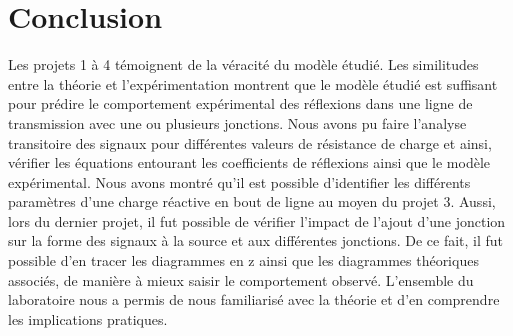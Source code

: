 \section{Conclusion}

Les projets 1 à 4 témoignent de la véracité du modèle étudié. Les similitudes entre la théorie et l'expérimentation montrent que le modèle étudié est suffisant pour prédire le comportement expérimental des réflexions dans une ligne de transmission avec une ou plusieurs jonctions. Nous avons pu faire l'analyse transitoire des signaux pour différentes valeurs de résistance de charge et ainsi, vérifier les équations entourant les coefficients de réflexions ainsi que le modèle expérimental.  Nous avons montré qu'il est possible d'identifier les différents paramètres d'une charge réactive en bout de ligne au moyen du projet 3. Aussi, lors du dernier projet, il fut possible de vérifier l'impact de l'ajout d'une jonction sur la forme des signaux à la source et aux différentes jonctions. De ce fait, il fut possible d'en tracer les diagrammes en z ainsi que les diagrammes théoriques associés, de manière à mieux saisir le comportement observé. L'ensemble du laboratoire nous a permis de nous familiarisé avec la théorie et d'en comprendre les implications pratiques. 

